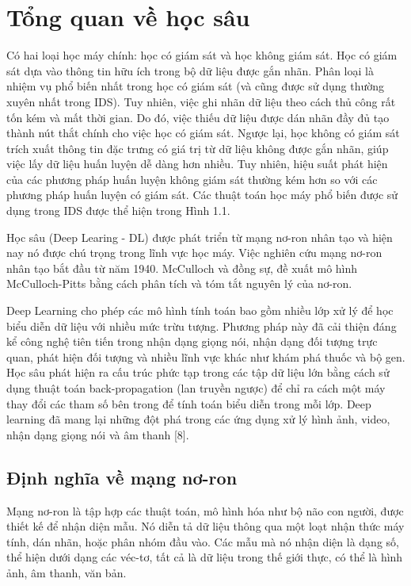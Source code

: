 \section{Tổng quan về học sâu}
Có hai loại học máy chính: học có giám sát và học không giám sát. Học có giám sát dựa vào thông tin hữu ích trong bộ dữ liệu được gắn nhãn. Phân loại là nhiệm vụ phổ biến nhất trong học có giám sát (và cũng được sử dụng thường xuyên nhất trong IDS). Tuy nhiên, việc ghi nhãn dữ liệu theo cách thủ công rất tốn kém và mất thời gian. Do đó, việc thiếu dữ liệu được dán nhãn đầy đủ tạo thành nút thắt chính cho việc học có giám sát. Ngược lại, học không có giám sát trích xuất thông tin đặc trưng có giá trị từ dữ liệu không được gắn nhãn, giúp việc lấy dữ liệu huấn luyện dễ dàng hơn nhiều. Tuy nhiên, hiệu suất phát hiện của các phương pháp huấn luyện không giám sát thường kém hơn so với các phương pháp huấn luyện có giám sát. Các thuật toán học máy phổ biến được sử dụng trong IDS được thể hiện trong Hình 1.1.

Học sâu (Deep Learing - DL) được phát triển từ mạng nơ-ron nhân tạo và hiện nay nó được chú trọng trong lĩnh vực học máy. Việc nghiên cứu mạng nơ-ron nhân tạo bắt đầu từ năm 1940. McCulloch và đồng sự, đề xuất mô hình McCulloch-Pitts bằng cách phân tích và tóm tắt nguyên lý của nơ-ron.

Deep Learning cho phép các mô hình tính toán bao gồm nhiều lớp xử lý để học biểu diễn dữ liệu với nhiều mức trừu tượng. Phương pháp này đã cải thiện đáng kể công nghệ tiên tiến trong nhận dạng giọng nói, nhận dạng đối tượng trực quan, phát hiện đối tượng và nhiều lĩnh vực khác như khám phá thuốc và bộ gen. Học sâu phát hiện ra cấu trúc phức tạp trong các tập dữ liệu lớn bằng cách sử dụng thuật toán back-propagation (lan truyền ngược) để chỉ ra cách một máy thay đổi các tham số bên trong để tính toán biểu diễn trong mỗi lớp. Deep learning đã mang lại những đột phá trong các ứng dụng xử lý hình ảnh, video, nhận dạng giọng nói và âm thanh [8]. 

\subsection{Định nghĩa về mạng nơ-ron}
Mạng nơ-ron là tập hợp các thuật toán, mô hình hóa như bộ não con người, được thiết kế để nhận diện mẫu. Nó diễn tả dữ liệu thông qua một loạt nhận thức máy tính, dán nhãn, hoặc phân nhóm đầu vào. Các mẫu mà nó nhận diện là dạng số, thể hiện dưới dạng các véc-tơ, tất cả là dữ liệu trong thế giới thực, có thể là hình ảnh, âm thanh, văn bản.

